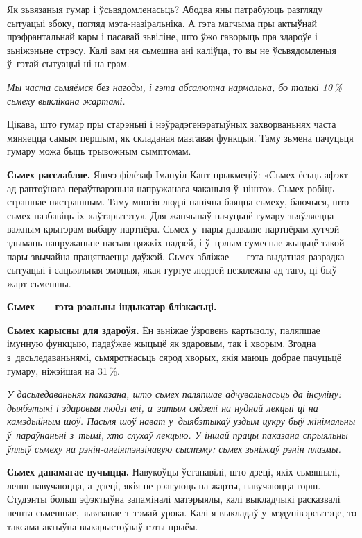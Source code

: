 Як зьвязаныя гумар і ўсьвядомленасьць? Абодва яны патрабуюць разгляду сытуацыі збоку, погляд мэта-назіральніка. А гэта магчыма пры актыўнай прэфрантальнай кары і пасавай зьвіліне, што ўжо гаворыць пра здароўе і зьніжэньне стрэсу. Калі вам ня сьмешна ані каліўца, то вы не ўсьвядомленыя ў~гэтай сытуацыі ні на грам. 

\emph{Мы часта сьмяёмся без нагоды, і гэта абсалютна нармальна, бо толькі 10\,\% сьмеху выклікана жартамі.}

Цікава, што гумар пры старэньні і нэўрадэгенэратыўных захворваньнях часта мяняецца самым першым, як складаная мазгавая функцыя. Таму зьмена пачуцьця гумару можа быць трывожным сымптомам.

\textbf{Сьмех расслабляе.} Яшчэ філёзаф Імануіл Кант прыкмеціў: «Сьмех ёсьць афэкт ад раптоўнага пераўтварэньня напружанага чаканьня ў~нішто». Сьмех робіць страшнае нястрашным. Таму многія людзі панічна баяцца сьмеху, баючыся, што сьмех пазбавіць іх «аўтарытэту». Для жанчынаў пачуцьцё гумару зьяўляецца важным крытэрам выбару партнёра. Сьмех у~пары дазваляе партнёрам хутчэй здымаць напружаньне пасьля цяжкіх падзей, і ў~цэлым сумеснае жыцьцё такой пары звычайна працягваецца даўжэй. Сьмех збліжае~--- гэта выдатная разрадка сытуацыі і сацыяльная эмоцыя, якая гуртуе людзей незалежна ад таго, ці быў жарт сьмешны. 

\textbf{Сьмех~--- гэта рэальны індыкатар блізкасьці.}

\textbf{Сьмех карысны для здароўя.} Ён зьніжае ўзровень картызолу, паляпшае імунную функцыю, падаўжае жыцьцё як здаровым, так і хворым. Згодна з~дасьледаваньнямі, сьмяротнасьць сярод хворых, якія маюць добрае пачуцьцё гумару, ніжэйшая на 31\,\%. 

\emph{У дасьледаваньнях паказана, што сьмех паляпшае адчувальнасьць да інсуліну: дыябэтыкі і здаровыя людзі елі, а~затым сядзелі на нуднай лекцыі ці на камэдыйным шоў. Пасьля шоў нават у~дыябэтыкаў уздым цукру быў мінімальны ў~параўнаньні з~тымі, хто слухаў лекцыю. У іншай працы паказана спрыяльны ўплыў сьмеху на рэнін-ангіятэнзінавую сыстэму: сьмех зьніжаў рэнін плазмы.}


\textbf{Сьмех дапамагае вучыцца.} Навукоўцы ўстанавілі, што дзеці, якіх сьмяшылі, лепш навучаюцца, а~дзеці, якія не рэагуюць на жарты, навучаюцца горш. Студэнты больш эфэктыўна запаміналі матэрыялы, калі выкладчыкі расказвалі нешта сьмешнае, зьвязанае з~тэмай урока. Калі я выкладаў у~мэдунівэрсытэце, то таксама актыўна выкарыстоўваў гэты прыём.

